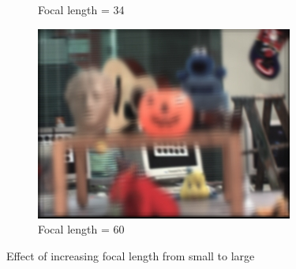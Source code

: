 \documentclass{article}
\begin{document}
\begin{figure}[htbp]
\begin{subfigure}[b]{0.32\textwidth}
        \caption{Focal length = 34} %
    \end{subfigure}
    \hfill
    \begin{subfigure}[b]{0.32\textwidth} %
        \centering
        \includegraphics[width=\textwidth]{f3.png} %
        \caption{Focal length = 60} %
    \end{subfigure}
    \caption{Effect of increasing focal length from small to large} %
    \label{fig:f}
\end{figure}
\end{document}
